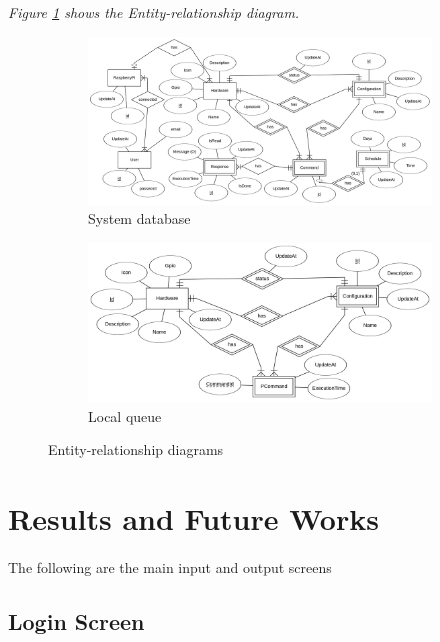 \documentclass[12pt]{paper}
\begin{document}
	\textit{Figure \ref{fig:erd} shows the Entity-relationship diagram.} 
	\begin{figure}[H]
		\begin{subfigure}[b]{\linewidth}
			\includegraphics[width=\linewidth]{img/diagram_er1.png}
			\caption{System database}
		\end{subfigure}
		
		\begin{subfigure}[b]{\linewidth}
			\includegraphics[width=\linewidth]{img/diagram_er2.png}
			\caption{Local queue}
		\end{subfigure}
		\caption{Entity-relationship diagrams}
		\label{fig:erd}
	\end{figure}
	
	


		\section{Results and Future Works}
		\paragraph{} The following are the main input and output screens
		\subsection{Login Screen}
\end{document}
